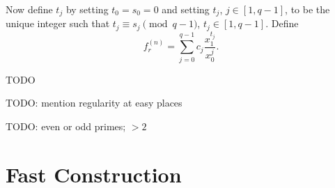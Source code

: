 \documentclass[12pt]{article}
\theoremstyle{plain}
\theoremstyle{definition}
\begin{document}
Now define $t_j$ by setting $t_0 = s_0 = 0$ and setting $t_j$, $j \in [1, q-1]$, to be the unique integer such that $t_j \equiv s_j \pmod{q-1}$, $t_j \in [1, q-1]$.  Define
\[
f^{(n)}_r = \sum_{j=0}^{q-1} c_j \frac{x_1^{t_j}}{x_0^j}.
\]

TODO

TODO: mention regularity at easy places


TODO: even or odd primes; $> 2$  




\section{Fast Construction}
\end{document}
